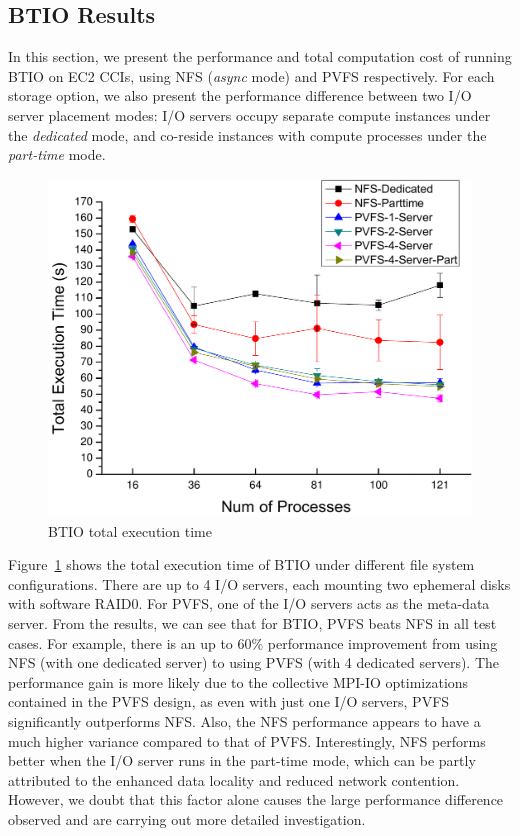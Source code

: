     \subsection{BTIO Results}
    In this section, we present the performance and total computation cost of
    running BTIO on EC2 CCIs, using NFS (\textit{async} mode) and PVFS
    respectively. For each storage option, we also present the performance
    difference between two I/O server placement modes: I/O servers occupy
    separate compute instances under the \textit{dedicated} mode, and
    co-reside instances with compute processes under the \textit{part-time}
    mode.
    \begin{figure}[htpb]
        \centering
        \includegraphics[width=0.8\linewidth]{../figures/T-time}
        \caption{BTIO total execution time}
        \label{fig:bt-time}
    \end{figure}

    Figure~\ref{fig:bt-time} shows the total execution time of BTIO under
    different file system configurations. There are up to 4 I/O servers, each
    mounting two ephemeral disks with software RAID0. For PVFS,
    one of the I/O servers acts as the meta-data server. From the results, we
    can see that for BTIO, PVFS beats NFS in all test cases. For example,
    there is an up to 60\% performance improvement from using NFS (with one
    dedicated server) to using PVFS (with 4 dedicated servers). The
    performance gain is more likely due to the collective MPI-IO optimizations
    contained in the PVFS design, as even with just one I/O servers, PVFS
    significantly outperforms NFS. Also, the NFS performance appears to have a
    much higher variance compared to that of PVFS. Interestingly, NFS performs
    better when the I/O server runs in the part-time mode, which can be partly
    attributed to the enhanced data locality and reduced network contention.
    However, we doubt that this factor alone causes the large performance
    difference observed and are carrying out more detailed investigation.

